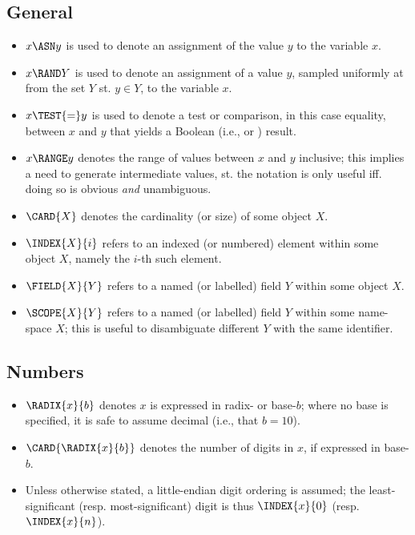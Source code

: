 
\subsection{General}

\begin{itemize}

\item $x \ASN     y$
      is used to denote an assignment of the value $y$
      to the variable $x$.
\item $x \RAND    Y$
      is used to denote an assignment of a   value $y$,
      sampled uniformly at from the set $Y$ st. $y \in Y$,
      to the variable $x$.
\item $x \TEST{=} y$
      is used to denote a  test or comparison,
      in this case equality,
      between $x$ and $y$ that yields a Boolean (i.e., \TRUE or \FALSE) result.
\item $x \RANGE   y$
      denotes the range of values between $x$ and $y$ inclusive; this implies
      a need to generate intermediate values, st. the notation is only useful
      iff. doing so is obvious {\em and} unambiguous.

\item  $\CARD{X}$
      denotes the cardinality (or size) of some object $X$.
\item $\INDEX{X}{i}$
      refers to an indexed (or numbered)
      element   within some object     $X$, namely the $i$-th such element.
\item $\FIELD{X}{Y}$
      refers to a  named (or labelled)
      field $Y$ within some object     $X$.
\item $\SCOPE{X}{Y}$
      refers to a  named (or labelled)
      field $Y$ within some name-space $X$;
      this is useful to disambiguate different $Y$ with the same identifier.

\end{itemize}


\subsection{Numbers}

\begin{itemize}

\item $\RADIX{x}{b}$ denotes $x$ is expressed in radix- or base-$b$; where no
      base is specified, it is safe to assume decimal (i.e., that $b = 10$).
\item $\CARD{\RADIX{x}{b}}$ denotes the number of digits in $x$, if expressed
      in base-$b$.
\item Unless otherwise stated, a little-endian digit ordering is assumed; the
      least-significant (resp. most-significant) digit is thus $\INDEX{x}{0}$
      (resp. $\INDEX{x}{n}$).

\end{itemize}

